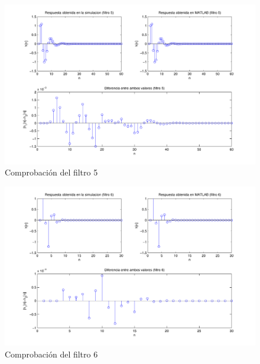 \documentclass[a4paper,12pt]{article}
\begin{document}
\begin{figure}[hbt]
\includegraphics[width=\textwidth]{img/respfiltro5.pdf} 
\caption{Comprobación del filtro 5} \label{fig:filter5}
\end{figure}

\begin{figure}[hbt]
\includegraphics[width=\textwidth]{img/respfiltro6.pdf} 
\caption{Comprobación del filtro 6} \label{fig:filter6}
\end{figure}

\clearpage
\end{document}
